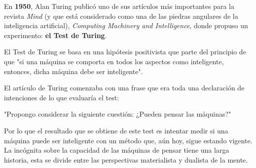 \documentclass[a4paper, 11pt]{article} %
\begin{document}
En \textbf{1950}, Alan Turing publicó uno de sus artículos más importantes para la revista \textit{Mind} (y que está considerado como una de las piedras angulares de la inteligencia artificial), \textit{Computing Machinery and Intelligence}, donde propuso un experimento: \textbf{el Test de Turing}.

El Test de Turing se basa en una hipótesis positivista que parte del principio de que "si una máquina se comporta en todos los aspectos como inteligente, entonces, dicha máquina debe ser inteligente".

El artículo de Turing comenzaba con una frase que era toda una declaración de intenciones de lo que evaluaría el test:
\begin{shaded}
"Propongo considerar la siguiente cuestión: ¿Pueden pensar las máquinas?"
\end{shaded}

Por lo que el resultado que se obtiene de este test es intentar medir si una máquina puede ser inteligente con un método que, aún hoy, sigue estando vigente.\\

La incógnita sobre la capacidad de las máquinas de pensar tiene una larga historia, esta se divide entre las perspectivas materialista y dualista de la mente.
\end{document}
